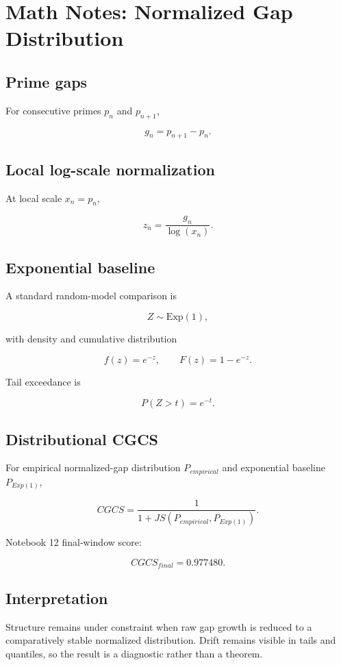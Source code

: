 \documentclass{article}
\begin{document}
\section*{Math Notes: Normalized Gap Distribution}

\subsection*{Prime gaps}

For consecutive primes $p_n$ and $p_{n+1}$,

\[
g_n = p_{n+1} - p_n.
\]

\subsection*{Local log-scale normalization}

At local scale $x_n = p_n$,

\[
z_n = \frac{g_n}{\log(x_n)}.
\]

\subsection*{Exponential baseline}

A standard random-model comparison is

\[
Z \sim \mathrm{Exp}(1),
\]

with density and cumulative distribution

\[
f(z) = e^{-z}, \qquad F(z) = 1 - e^{-z}.
\]

Tail exceedance is

\[
P(Z > t) = e^{-t}.
\]

\subsection*{Distributional CGCS}

For empirical normalized-gap distribution $P_{empirical}$ and exponential baseline $P_{Exp(1)}$,

\[
CGCS = \frac{1}{1 + JS(P_{empirical}, P_{Exp(1)})}.
\]

Notebook 12 final-window score:

\[
CGCS_{final} = 0.977480.
\]

\subsection*{Interpretation}

Structure remains under constraint when raw gap growth is reduced to a comparatively stable normalized distribution. Drift remains visible in tails and quantiles, so the result is a diagnostic rather than a theorem.
\end{document}

